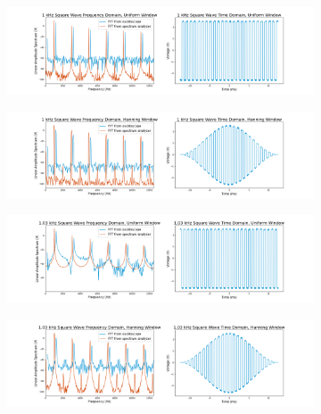 \documentclass[12pt]{article}
\begin{document}
    \begin{figure}[!ht]
        \centering
        \begin{subfigure}[h]{\textwidth}
        \includegraphics[width=\textwidth]{1 kHz Square Wave (uniform)}
        \caption{}
        \label{fig:1 square uniform}
        \end{subfigure}
        \begin{subfigure}[h]{\textwidth}
        \includegraphics[width=\textwidth]{1 kHz Square Wave (hanning)}
        \caption{}
        \label{fig:1 square hanning}
        \end{subfigure}
        \begin{subfigure}[h]{\textwidth}
        \includegraphics[width=\textwidth]{1_03 kHz Square Wave (uniform)}
        \caption{}
        \label{fig:1.03 square uniform}
        \end{subfigure}
        \begin{subfigure}[h]{\textwidth}
        \includegraphics[width=\textwidth]{1_03 kHz Square Wave (hanning)}
        \caption{}
        \label{fig:1.03 square hanning}
        \end{subfigure}
    \end{figure} %
    
\end{document}
